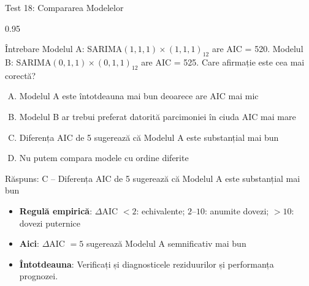 \documentclass[9pt, aspectratio=169, t]{beamer}
\begin{document}
\begin{frame}{Test 18: Compararea Modelelor}
    \begin{cminipage}{0.95\textwidth}
    \begin{alertblock}{Întrebare}
        Modelul A: SARIMA$(1,1,1) \times (1,1,1)_{12}$ are AIC = 520. Modelul B: SARIMA$(0,1,1) \times (0,1,1)_{12}$ are AIC = 525. Care afirmație este cea mai corectă?
    \end{alertblock}

    \vspace{0.3cm}

    \begin{enumerate}[A)]\setlength{\itemsep}{0pt}
        \item Modelul A este întotdeauna mai bun deoarece are AIC mai mic
        \item Modelul B ar trebui preferat datorită parcimoniei în ciuda AIC mai mare
        \item Diferența AIC de 5 sugerează că Modelul A este substanțial mai bun
        \item Nu putem compara modele cu ordine diferite
    \end{enumerate}

    \vspace{0.5cm}
    \pause
    \begin{exampleblock}{Răspuns: C -- Diferența AIC de 5 sugerează că Modelul A este substanțial mai bun}
        {\small
        \begin{itemize}\setlength{\itemsep}{0pt}
        \item \textbf{Regulă empirică}: $\Delta$AIC $< 2$: echivalente; $2$--$10$: anumite dovezi; $> 10$: dovezi puternice
        \item \textbf{Aici}: $\Delta$AIC $= 5$ sugerează Modelul A semnificativ mai bun
        \item \textbf{Întotdeauna}: Verificați și diagnosticele reziduurilor și performanța prognozei.
        \end{itemize}
        }
    \end{exampleblock}
    \end{cminipage}
\end{frame}
\end{document}
